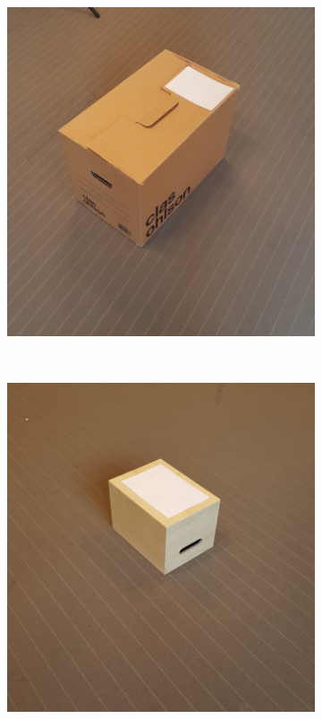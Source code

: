 \begin{figure}
	\centering
	\begin{subfigure}[b]{0.3\textwidth}
		\includegraphics[width=\textwidth]{figures/package_1.jpg}
		\caption{}
		\label{fig:package_1}
	\end{subfigure}%
	~~~ %
	\begin{subfigure}[b]{0.3\textwidth}
		\includegraphics[width=\textwidth]{figures/package_2.jpg}

\end{subfigure}
\end{figure}
